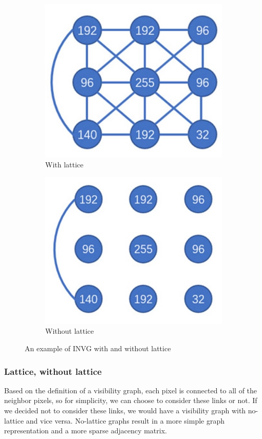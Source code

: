 \documentclass[conference]{IEEEtran}
\begin{document}
\begin{figure}[h]
    \centering
    \begin{subfigure}{0.24\textwidth}
        \centering
        \includegraphics[width=0.55\linewidth]{Lattice_IVG.jpg}
        \caption{With lattice}
        \label{fig:lattice_example}
    \end{subfigure}
    \hfill
    \begin{subfigure}{0.24\textwidth}
        \centering
        \includegraphics[width=0.55\linewidth]{Nolattice_IVG.jpg}
        \caption{Without lattice}
        \label{fig:nolattice_example}
    \end{subfigure}
    \caption{An example of INVG with and without lattice\cite{b1}}
    \label{fig:lattice_nolattice_example}
\end{figure}


\subsubsection{\textbf{Lattice, without lattice}}
Based on the definition of a visibility graph, each pixel is connected to all of the neighbor pixels, so for simplicity, we can choose to consider these links or not. If we decided not to consider these links, we would have a visibility graph with no-lattice and vice versa. No-lattice graphs result in a more simple graph representation and a more sparse adjacency matrix.
\end{document}
